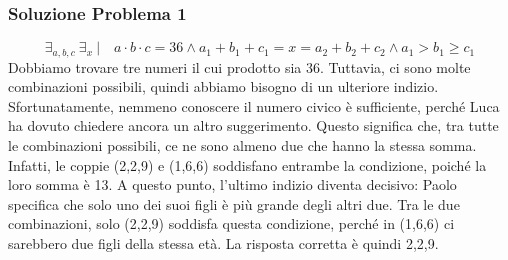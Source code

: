 \documentclass[a4paper,12pt]{article}
\begin{document}
\subsubsection*{Soluzione Problema 1}
\[
\exists_{a,b,c} \: \exists_{x} \: | \quad a \cdot b \cdot c = 36 \land  a_{1} + b_{1} + c_{1} = x  = a_{2} + b_{2} + c_{2} \land a_{1} > b_{1} \ge c_{1}
\]
Dobbiamo trovare tre numeri il cui prodotto sia 36. Tuttavia, ci sono molte combinazioni possibili, quindi abbiamo bisogno di un ulteriore indizio.
Sfortunatamente, nemmeno conoscere il numero civico è sufficiente, perché Luca ha dovuto chiedere ancora un altro suggerimento. Questo significa che, tra tutte le combinazioni possibili, ce ne sono almeno due che hanno la stessa somma.
Infatti, le coppie (2,2,9) e (1,6,6) soddisfano entrambe la condizione, poiché la loro somma è 13. A questo punto, l'ultimo indizio diventa decisivo: Paolo specifica che solo uno dei suoi figli è più grande degli altri due.
Tra le due combinazioni, solo (2,2,9) soddisfa questa condizione, perché in (1,6,6) ci sarebbero due figli della stessa età.
La risposta corretta è quindi 2,2,9.
\end{document}
